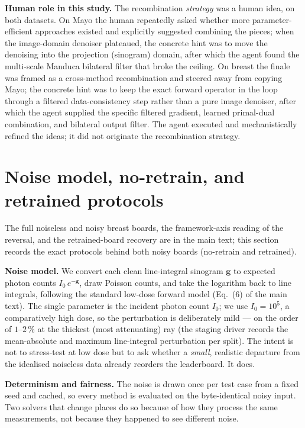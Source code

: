 \documentclass[AMA,twocolumn]{USG}
\begin{document}
\textbf{Human role in this study.} The recombination \emph{strategy} was a human idea, on both datasets. On Mayo the human repeatedly asked whether more parameter-efficient approaches existed and explicitly suggested combining the pieces; when the image-domain denoiser plateaued, the concrete hint was to move the denoising into the projection (sinogram) domain, after which the agent found the multi-scale Manduca bilateral filter that broke the ceiling. On breast the finale was framed as a cross-method recombination and steered away from copying Mayo; the concrete hint was to keep the exact forward operator in the loop through a filtered data-consistency step rather than a pure image denoiser, after which the agent supplied the specific filtered gradient, learned primal-dual combination, and bilateral output filter. The agent executed and mechanistically refined the ideas; it did not originate the recombination strategy.

\section{Noise model, no-retrain, and retrained protocols}\label{sec:s6}

The full noiseless and noisy breast boards, the framework-axis reading of the reversal, and the retrained-board recovery are in the main text; this section records the exact protocols behind both noisy boards (no-retrain and retrained).

\textbf{Noise model.} We convert each clean line-integral sinogram $\mathbf{g}$ to expected photon counts $I_0\,e^{-\mathbf{g}}$, draw Poisson counts, and take the logarithm back to line integrals, following the standard low-dose forward model (Eq.~(6) of the main text). The single parameter is the incident photon count $I_0$; we use $I_0=10^5$, a comparatively high dose, so the perturbation is deliberately mild --- on the order of $1$--$2\,\%$ at the thickest (most attenuating) ray (the staging driver records the mean-absolute and maximum line-integral perturbation per split). The intent is not to stress-test at low dose but to ask whether a \emph{small}, realistic departure from the idealised noiseless data already reorders the leaderboard. It does.

\textbf{Determinism and fairness.} The noise is drawn once per test case from a fixed seed and cached, so every method is evaluated on the byte-identical noisy input. Two solvers that change places do so because of how they process the same measurements, not because they happened to see different noise.
\end{document}
